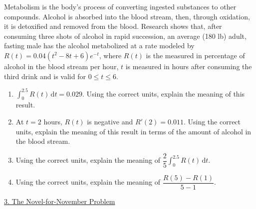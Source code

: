 Metabolism is the body's process of converting ingested substances to other compounds. Alcohol is absorbed into the blood stream, then, through oxidation, it is detoxified and removed from the blood. Research shows that, after consuming three shots of alcohol in rapid succession, an average (180 lb) adult, fasting male has the alcohol metabolized at a rate modeled by $R(t) = 0.04\left(t^2 - 8t + 6\right)e^{-t}$, where $R(t)$ is the measured in percentage of alcohol in the blood stream per hour, $t$ is measured in hours after consuming the third drink and is valid for $0 \leq t \leq 6$. \\
\begin{enumerate}[label=\hspace{11pt}(\alph*), align=left, leftmargin=*, labelsep=0.25em]
    \item $\int_0^{2.5} R(t) \,\mathrm{d}t = 0.029$. Using the correct units, explain the meaning of this result. 
    \item At $t = 2$ hours, $R(t)$ is negative and $R'(2) = 0.011$. Using the correct units, explain the meaning of this result in terms of the amount of alcohol in the blood stream. 
    \item Using the correct units, explain the meaning of $\dfrac{2}{5}\int_0^{2.5} R(t) \,\mathrm{d}t$. 
    \item Using the correct units, explain the meaning of $\dfrac{R(5) - R(1)}{5 - 1}$.
\end{enumerate} \vspace{11pt}

\begin{center}
    \underline{3. The Novel-for-November Problem}
\end{center}


